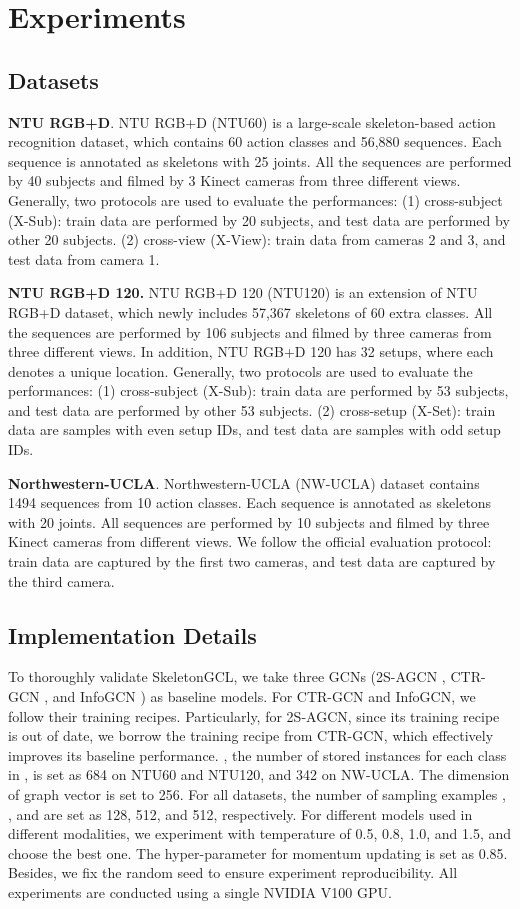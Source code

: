 \documentclass{article} \usepackage{iclr2023_conference,times}
\begin{document}
\section{Experiments}
\subsection{Datasets}
\textbf{NTU RGB+D}. NTU RGB+D (NTU60) \citep{ntu60} is a large-scale skeleton-based action recognition dataset, which contains 60 action classes and 56,880 sequences. Each sequence is annotated as skeletons with 25 joints. All the sequences are performed by 40 subjects and filmed by 3 Kinect cameras from three different views. Generally, two protocols are used to evaluate the performances: (1) cross-subject (X-Sub): train data are performed by 20 subjects, and test data are performed by other 20 subjects. (2) cross-view (X-View): train data from cameras 2 and 3, and test data from camera 1.

\textbf{NTU RGB+D 120.} NTU RGB+D 120 (NTU120) \citep{ntu120} is an extension of NTU RGB+D dataset, which newly includes 57,367 skeletons of 60 extra classes. All the sequences are performed by 106 subjects and filmed by three cameras from three different views. In addition, NTU RGB+D 120 has 32 setups, where each denotes a unique location. Generally, two protocols are used to evaluate the performances: (1) cross-subject (X-Sub): train data are performed by 53 subjects, and test data are performed by other 53 subjects. (2) cross-setup (X-Set): train data are samples with even setup IDs, and test data are samples with odd setup IDs.

\textbf{Northwestern-UCLA}. Northwestern-UCLA (NW-UCLA) dataset \citep{nw-ucla} contains 1494 sequences from 10 action classes. Each sequence is annotated as skeletons with 20 joints. All sequences are performed by 10 subjects and filmed by three Kinect cameras from different views. We follow the official evaluation protocol: train data are captured by the first two cameras, and test data are captured by the third camera.

\subsection{Implementation Details}
To thoroughly validate SkeletonGCL, we take three GCNs (2S-AGCN \citep{2SAGCN}, CTR-GCN \citep{CTRGCN}, and InfoGCN \citep{INFOGCN}) as baseline models. For CTR-GCN and InfoGCN, we follow their training recipes. Particularly, for 2S-AGCN, since its training recipe is out of date, we borrow the training recipe from CTR-GCN, which effectively improves its baseline performance. , the number of stored instances for each class in , is set as 684 on NTU60 and NTU120, and 342 on NW-UCLA. The dimension of graph vector  is set to 256. For all datasets, the number of sampling examples , , and  are set as 128, 512, and 512, respectively. For different models used in different modalities, we experiment with temperature  of 0.5, 0.8, 1.0, and 1.5, and choose the best one. The hyper-parameter  for momentum updating is set as 0.85. Besides, we fix the random seed to ensure experiment reproducibility. All experiments are conducted using a single NVIDIA V100 GPU.
\end{document}
